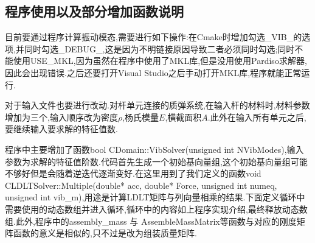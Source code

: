 \subsection{程序使用以及部分增加函数说明}
目前要通过程序计算振动模态,需要进行如下操作:在Cmake时增加勾选\_VIB\_的选项,并同时勾选\_DEBUG\_,这是因为不明链接原因导致二者必须同时勾选;同时不能使用USE\_MKL,因为虽然在程序中使用了MKL库,但是没用使用Pardiso求解器,因此会出现错误.之后还要打开Visual Studio之后手动打开MKL库,程序就能正常运行.

对于输入文件也要进行改动.对杆单元连接的质弹系统,在输入杆的材料时,材料参数增加为三个,输入顺序改为密度$\rho$,杨氏模量$E$,横截面积$A$.此外在输入所有单元之后,要继续输入要求解的特征值数.

程序中主要增加了函数bool CDomain::VibSolver(unsigned int NVibModes),输入参数为求解的特征值阶数.代码首先生成一个初始基向量组,这个初始基向量组可能不够好但是会随着逆迭代逐渐变好.在这里用到了我们定义的函数void CLDLTSolver::Multiple(double* acc, double* Force, unsigned int numeq, unsigned int vib\_m),用途是计算LDLT矩阵与列向量相乘的结果.下面定义循环中需要使用的动态数组并进入循环,循环中的内容如上程序实现介绍,最终释放动态数组.此外,程序中的assembly\_mass 与 AssembleMassMatrix等函数与对应的刚度矩阵函数的意义是相似的,只不过是改为组装质量矩阵.

